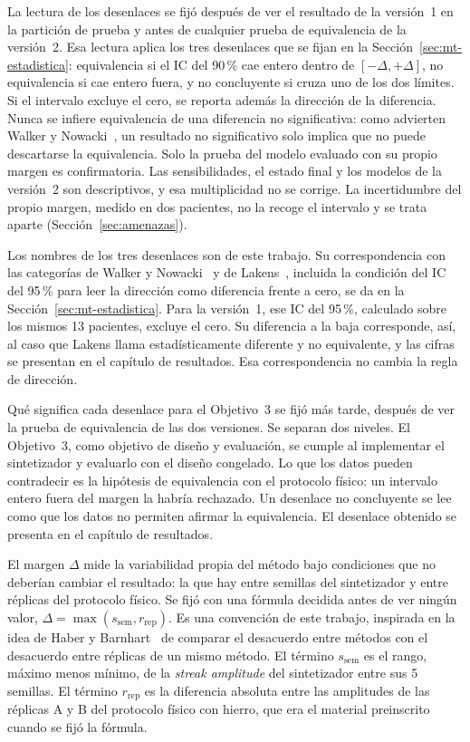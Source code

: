 La lectura de los desenlaces se fijó después de ver el resultado de la versión~1 en la partición de prueba y antes de cualquier prueba de equivalencia de la versión~2. Esa lectura aplica los tres desenlaces que se fijan en la Sección~\ref{sec:mt-estadistica}: equivalencia si el IC del 90\,\% cae entero dentro de $[-\Delta, +\Delta]$, no equivalencia si cae entero fuera, y no concluyente si cruza uno de los dos límites. Si el intervalo excluye el cero, se reporta además la dirección de la diferencia. Nunca se infiere equivalencia de una diferencia no significativa: como advierten Walker y Nowacki~\cite{walker2011understanding}, un resultado no significativo solo implica que no puede descartarse la equivalencia. Solo la prueba del modelo evaluado con su propio margen es confirmatoria. Las sensibilidades, el estado final y los modelos de la versión~2 son descriptivos, y esa multiplicidad no se corrige. La incertidumbre del propio margen, medido en dos pacientes, no la recoge el intervalo y se trata aparte (Sección~\ref{sec:amenazas}).

Los nombres de los tres desenlaces son de este trabajo. Su correspondencia con las categorías de Walker y Nowacki~\cite{walker2011understanding} y de Lakens~\cite{lakens2017equivalence}, incluida la condición del IC del 95\,\% para leer la dirección como diferencia frente a cero, se da en la Sección~\ref{sec:mt-estadistica}. Para la versión~1, ese IC del 95\,\%, calculado sobre los mismos 13 pacientes, excluye el cero. Su diferencia a la baja corresponde, así, al caso que Lakens llama estadísticamente diferente y no equivalente, y las cifras se presentan en el capítulo de resultados. Esa correspondencia no cambia la regla de dirección.

Qué significa cada desenlace para el Objetivo~3 se fijó más tarde, después de ver la prueba de equivalencia de las dos versiones. Se separan dos niveles. El Objetivo~3, como objetivo de diseño y evaluación, se cumple al implementar el sintetizador y evaluarlo con el diseño congelado. Lo que los datos pueden contradecir es la hipótesis de equivalencia con el protocolo físico: un intervalo entero fuera del margen la habría rechazado. Un desenlace no concluyente se lee como que los datos no permiten afirmar la equivalencia. El desenlace obtenido se presenta en el capítulo de resultados.

El margen $\Delta$ mide la variabilidad propia del método bajo condiciones que no deberían cambiar el resultado: la que hay entre semillas del sintetizador y entre réplicas del protocolo físico. Se fijó con una fórmula decidida antes de ver ningún valor, $\Delta = \max(s_{\mathrm{sem}}, r_{\mathrm{rep}})$. Es una convención de este trabajo, inspirada en la idea de Haber y Barnhart~\cite{haber2008general} de comparar el desacuerdo entre métodos con el desacuerdo entre réplicas de un mismo método. El término $s_{\mathrm{sem}}$ es el rango, máximo menos mínimo, de la \emph{streak amplitude} del sintetizador entre sus 5 semillas. El término $r_{\mathrm{rep}}$ es la diferencia absoluta entre las amplitudes de las réplicas A y B del protocolo físico con hierro, que era el material preinscrito cuando se fijó la fórmula.


